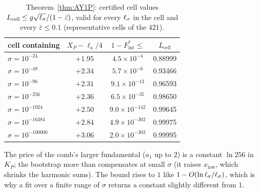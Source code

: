 \begin{table}
\caption{Theorem~\ref{thm:AY1P}: certified cell values $L_{\mathrm{cell}}\le g\sqrt{\ell_\sigma}/(1-\bar\varepsilon)$, valid for every $\ell_\sigma$ in the cell and every
$\bar\varepsilon\le0.1$ (representative cells of the $421$).}
\label{tab:lower}
\begin{ruledtabular}
\begin{tabular}{lccc}
cell containing & $X_P-\ell_a/4$ & $1-F_{\mathrm{int}}^*\le$ & $L_{\mathrm{cell}}$\\ \hline
$\sigma=10^{-24}$ & $+1.95$ & $4.5\times10^{-4}$ & 0.88999\\
$\sigma=10^{-48}$ & $+2.34$ & $5.7\times10^{-6}$ & 0.93466\\
$\sigma=10^{-96}$ & $+2.31$ & $9.1\times10^{-13}$ & 0.96593\\
$\sigma=10^{-256}$ & $+2.36$ & $6.5\times10^{-35}$ & 0.98650\\
$\sigma=10^{-1024}$ & $+2.50$ & $9.0\times10^{-142}$ & 0.99645\\
$\sigma=10^{-16384}$ & $+2.84$ & $4.9\times10^{-302}$ & 0.99975\\
$\sigma=10^{-100000}$ & $+3.06$ & $2.0\times10^{-302}$ & 0.99995\\
\end{tabular}
\end{ruledtabular}
\end{table}

The price of the comb's larger fundamental ($a_1$ up to $2$) is a constant $\ln256$ in $K_P$; the bootstrap more than compensates at
small $\sigma$ (it raises $x_{\mathrm{low}}$, which shrinks the harmonic sums). The bound rises to $1$ like $1-O(\ln\ell_\sigma/\ell_\sigma)$, which is why a fit over
a finite range of $\sigma$ returns a constant slightly different from $1$.
